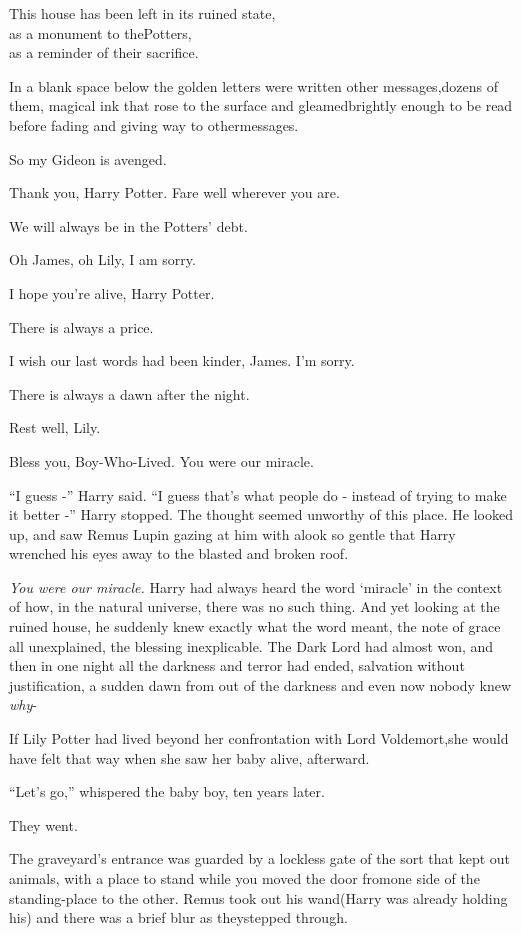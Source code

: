 This house has been left in its ruined state,\\ as a monument to thePotters,\\ as a reminder of their sacrifice.

In a blank space below the golden letters were written other messages,dozens of them, magical ink that rose to the surface and gleamedbrightly enough to be read before fading and giving way to othermessages.

So my Gideon is avenged.

Thank you, Harry Potter. Fare well wherever you are.

We will always be in the Potters' debt.

Oh James, oh Lily, I am sorry.

I hope you're alive, Harry Potter.

There is always a price.

I wish our last words had been kinder, James. I'm sorry.

There is always a dawn after the night.

Rest well, Lily.

Bless you, Boy-Who-Lived. You were our miracle.

“I guess -” Harry said. “I guess that's what people do - instead of trying to make it better -” Harry stopped. The thought seemed unworthy of this place. He looked up, and saw Remus Lupin gazing at him with alook so gentle that Harry wrenched his eyes away to the blasted and broken roof.

\emph{You were our miracle.} Harry had always heard the word `miracle' in the context of how, in the natural universe, there was no such thing. And yet looking at the ruined house, he suddenly knew exactly what the word meant, the note of grace all unexplained, the blessing inexplicable. The Dark Lord had almost won, and then in one night all the darkness and terror had ended, salvation without justification, a sudden dawn from out of the darkness and even now nobody knew \emph{why}-

If Lily Potter had lived beyond her confrontation with Lord Voldemort,she would have felt that way when she saw her baby alive, afterward.

“Let's go,” whispered the baby boy, ten years later.

They went.

The graveyard's entrance was guarded by a lockless gate of the sort that kept out animals, with a place to stand while you moved the door fromone side of the standing-place to the other. Remus took out his wand(Harry was already holding his) and there was a brief blur as theystepped through.

